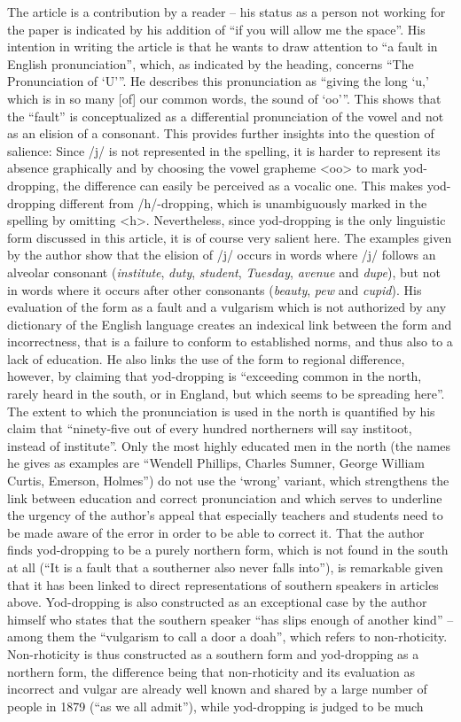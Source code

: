 The article is a contribution by a reader – his status as a person not working for the paper is indicated by his addition of “if you will allow me the space”. His intention in writing the article is that he wants to draw attention to “a fault in English pronunciation”, which, as indicated by the heading, concerns “The Pronunciation of ‘U’”. He describes this pronunciation as “giving the long ‘u,’ which is in so many [of] our common words, the sound of ‘oo’”. This shows that the “fault” is conceptualized as a differential pronunciation of the vowel and not as an elision of a consonant. This provides further insights into the question of salience: Since /j/ is not represented in the spelling, it is harder to represent its absence graphically and by choosing the vowel grapheme <oo> to mark yod-dropping, the difference can easily be perceived as a vocalic one. This makes yod-dropping different from /h/-dropping, which is unambiguously marked in the spelling by omitting <h>. Nevertheless, since yod-dropping is the only linguistic form discussed in this article, it is of course very salient here. The examples given by the author show that the elision of /j/ occurs in words where /j/ follows an alveolar consonant (\emph{institute}, \emph{duty}, \emph{student}, \emph{Tuesday}, \emph{avenue} and \emph{dupe}), but not in words where it occurs after other consonants (\emph{beauty}, \emph{pew} and \emph{cupid}). His evaluation of the form as a fault and a vulgarism which is not authorized by any dictionary of the English language creates an indexical link between the form and incorrectness, that is a failure to conform to established norms, and thus also to a lack of education. He also links the use of the form to regional difference, however, by claiming that yod-dropping is “exceeding common in the north, rarely heard in the south, or in England, but which seems to be spreading here”. The extent to which the pronunciation is used in the north is quantified by his claim that “ninety-five out of every hundred northerners will say institoot, instead of institute”. Only the most highly educated men in the north (the names he gives as examples are “Wendell Phillips, Charles Sumner, George William Curtis, Emerson, Holmes”) do not use the ‘wrong’ variant, which strengthens the link between education and correct pronunciation and which serves to underline the urgency of the author’s appeal that especially teachers and students need to be made aware of the error in order to be able to correct it. That the author finds yod-dropping to be a purely northern form, which is not found in the south at all (“It is a fault that a southerner also never falls into”), is remarkable given that it has been linked to direct representations of southern speakers in articles above. Yod-dropping is also constructed as an exceptional case by the author himself who states that the southern speaker “has slips enough of another kind” – among them the “vulgarism to call a door a doah”, which refers to non-rhoticity. Non-rhoticity is thus constructed as a southern form and yod-dropping as a northern form, the difference being that non-rhoticity and its evaluation as incorrect and vulgar are already well known and shared by a large number of people in 1879 (“as we all admit”), while yod-dropping is judged to be much 